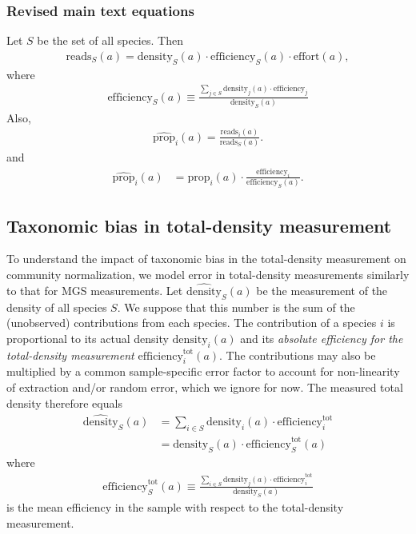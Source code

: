 \documentclass[
]{article}
\begin{document}
\hypertarget{revised-main-text-equations}{%
\subsubsection{Revised main text equations}\label{revised-main-text-equations}}

Let \(S\) be the set of all species.
Then
\begin{align}
  \text{reads}_S(a)
    = \text{density}_S(a) \cdot \text{efficiency}_S(a) \cdot \text{effort}(a),
\end{align}
where
\begin{align}
  \text{efficiency}_S(a) 
  \equiv \frac{\sum_{j\in S}\text{density}_j(a)\cdot \text{efficiency}_j}{\text{density}_S(a)}
\end{align}
Also,
\begin{align}
  \widehat{\text{prop}}_{i}(a) = \frac{\text{reads}_i(a)}{\text{reads}_S(a)}.
\end{align}
and
\begin{align}
  \widehat{\text{prop}}_{i}(a)
  &= \text{prop}_{i}(a) \cdot \frac{\text{efficiency}_{i}}{\text{efficiency}_S(a)}.
\end{align}

\hypertarget{total-density-bias}{%
\subsection{Taxonomic bias in total-density measurement}\label{total-density-bias}}

To understand the impact of taxonomic bias in the total-density measurement on community normalization, we model error in total-density measurements similarly to that for MGS measurements.
Let \(\widehat{\text{density}}_{S}(a)\) be the measurement of the density of all species \(S\).
We suppose that this number is the sum of the (unobserved) contributions from each species.
The contribution of a species \(i\) is proportional to its actual density \(\text{density}_{i}(a)\) and its \emph{absolute efficiency for the total-density measurement} \(\text{efficiency}_{i}^{\text{tot}}(a)\).
The contributions may also be multiplied by a common sample-specific error factor to account for non-linearity of extraction and/or random error, which we ignore for now.
The measured total density therefore equals
\begin{align}
  \widehat{\text{density}}_S(a) 
  &= \sum_{i\in S} \text{density}_i(a) \cdot \text{efficiency}^{\text{tot}}_i
\\&= \text{density}_S(a) \cdot \text{efficiency}^{\text{tot}}_S(a)
\end{align}
where
\begin{align}
  \label{eq:app-total-mean-efficiency}
  \text{efficiency}^{\text{tot}}_S(a) 
  \equiv \frac{\sum_{i \in S}\text{density}_j(a)\cdot \text{efficiency}^{\text{tot}}_i}{\text{density}_S(a)}
\end{align}
is the mean efficiency in the sample with respect to the total-density measurement.
\end{document}
